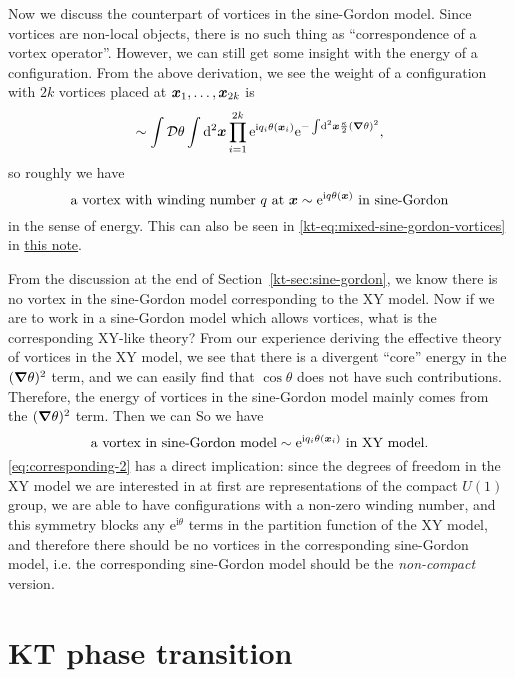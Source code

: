 \documentclass[hyperref, a4paper]{article}
\newcommand*{\ii}{\mathrm{i}}
\newcommand*{\ee}{\mathrm{e}}
\newcommand*{\fd}[1]{\mathcal{D} #1}
\newcommand{\ktnote}{\href{../topological-phases-reading-notes/kt.pdf}{this note}}
\begin{document}
Now we discuss the counterpart of vortices in the sine-Gordon model. Since vortices are non-local objects,
there is no such thing as ``correspondence of a vortex operator''. However, we can still get some insight 
with the energy of a configuration. From the above derivation, we see the weight of a configuration with 
$2k$ vortices placed at $\vb*{x}_1, \ldots, \vb*{x}_{2k}$ is
\[
    \sim \int \fd{\theta} \int \dd[2]{\vb*{x}} \prod_{i=1}^{2k} \ee^{\ii q_i \theta(\vb*{x}_i)} \ee^{- \int \dd[2]{\vb*{x}} \frac{\kappa}{2} (\grad \theta)^2},
\]
so roughly we have  
\begin{equation}
    \text{a vortex with winding number $q$ at $\vb*{x}$} \sim \text{$\ee^{\ii q \theta(\vb*{x})}$ in sine-Gordon}
    \label{eq:corresponding-1}
\end{equation}
in the sense of energy. This can also be seen in \eqref{kt-eq:mixed-sine-gordon-vortices} in \ktnote. 

From the discussion at the end of Section~\ref{kt-sec:sine-gordon}, we know there is no vortex in the 
sine-Gordon model corresponding to the XY model. Now if we are to work in a sine-Gordon model which 
allows vortices, what is the corresponding XY-like theory? From our experience deriving the effective 
theory of vortices in the XY model, we see that there is a divergent ``core'' energy in the $(\grad \theta)^2$ 
term, and we can easily find that $\cos \theta$ does not have such contributions. Therefore, 
the energy of vortices in the sine-Gordon model mainly comes from the $(\grad \theta)^2$ term. 
Then we can %
So we have 
\begin{equation}
    \text{a vortex in sine-Gordon model} \sim \text{$\ee^{\ii q_i \theta(\vb*{x}_i)}$ in XY model}.
    \label{eq:corresponding-2}
\end{equation}
\eqref{eq:corresponding-2} has a direct implication: since the degrees of freedom in the XY model we are 
interested in at first are representations of the compact $U(1)$ group, we are able to have configurations 
with a non-zero winding number, and this symmetry blocks any $\ee^{\ii \theta}$ terms in the partition 
function of the XY model, and therefore there should be no vortices in the corresponding sine-Gordon 
model, i.e. the corresponding sine-Gordon model should be the \emph{non-compact} version.

\section{KT phase transition}



 
\end{document}
